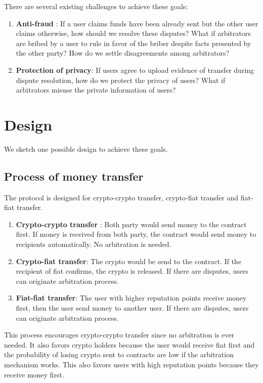 \documentclass[letterpaper,twocolumn,10pt]{article}
\begin{document}
There are several existing challenges to achieve these goals:
\begin{enumerate}
    \item \textbf{Anti-fraud} : If a user claims funds have been already sent but the other user claims otherwise, how should we resolve these disputes? What if arbitrators are bribed by a user to rule in favor of the briber despite facts presented by the other party? How do we settle disagreements among arbitrators?
    \item \textbf{Protection of privacy}: If users agree to upload evidence of transfer during dispute resolution, how do we protect the privacy of users? What if arbitrators misuse the private information of users?
\end{enumerate}

\section{Design}
We sketch one possible design to achieve these goals.


\subsection{Process of money transfer}
The protocol is designed for crypto-crypto transfer, crypto-fiat transfer and fiat-fiat transfer. 

\begin{enumerate}
    \item \textbf{Crypto-crypto transfer} : Both party would send money to the contract first. If money is received from both party, the contract would send money to recipients automatically. No arbitration is needed.
    \item \textbf{Crypto-fiat transfer}: The crypto would be send to the contract. If the recipient of fiat confirms, the crypto is released. If there are disputes, users can originate arbitration process.
    \item \textbf{Fiat-fiat transfer}: The user with higher reputation points receive money first, then the user send money to another user. If there are disputes, users can originate arbitration process.
\end{enumerate}

This process encourages crypto-crypto transfer since no arbitration is ever needed. It also favors crypto holders because the user would receive fiat first and the probability of losing crypto sent to contracts are low if the arbitration mechanism works. This also favors users with high reputation points because they receive money first.
\end{document}
